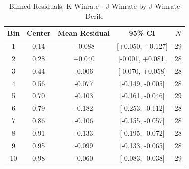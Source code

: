 \begin{table}[htbp]
\centering
\caption{Binned Residuals: K Winrate - J Winrate by J Winrate Decile}
\label{tab:binned_residuals}
\begin{tabular}{ccccc}
\toprule
Bin & Center & Mean Residual & 95\% CI & $N$ \\
\midrule
1 & 0.14 & +0.088 & [+0.050, +0.127] & 29 \\
2 & 0.28 & +0.040 & [-0.001, +0.081] & 28 \\
3 & 0.44 & -0.006 & [-0.070, +0.058] & 28 \\
4 & 0.56 & -0.077 & [-0.149, -0.005] & 28 \\
5 & 0.70 & -0.103 & [-0.161, -0.046] & 29 \\
6 & 0.79 & -0.182 & [-0.253, -0.112] & 28 \\
7 & 0.86 & -0.106 & [-0.155, -0.057] & 28 \\
8 & 0.91 & -0.133 & [-0.195, -0.072] & 28 \\
9 & 0.95 & -0.099 & [-0.133, -0.065] & 28 \\
10 & 0.98 & -0.060 & [-0.083, -0.038] & 29 \\
\bottomrule
\end{tabular}
\end{table}